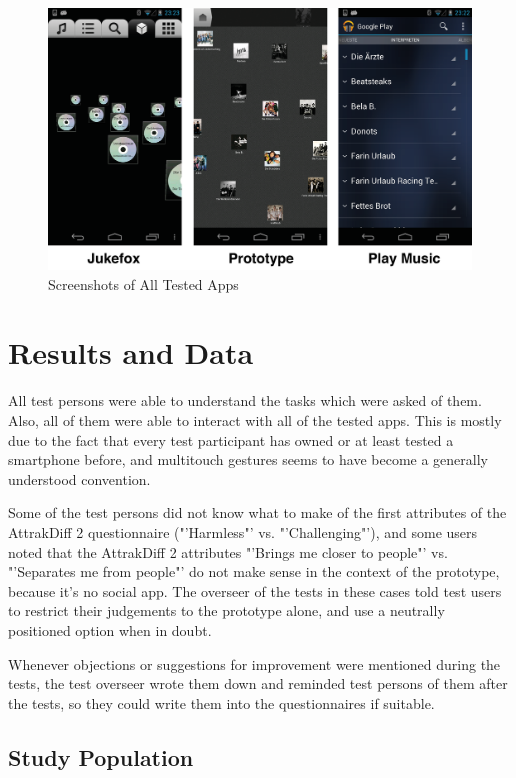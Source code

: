 \begin{figure}[H]
  \centering
    \includegraphics[width=1\textwidth]{figures/apps_screenshots}
  \caption{Screenshots of All Tested Apps}
  \label{fig:apps_screenshots}
\end{figure}

\section{Results and Data}

All test persons were able to understand the tasks which were asked of them. Also, all of them were able to interact with all of the tested apps. This is mostly due to the fact that every test participant has owned or at least tested a smartphone before, and multitouch gestures seems to have become a generally understood convention.

Some of the test persons did not know what to make of the first attributes of the AttrakDiff 2 questionnaire ("'Harmless"' vs. "'Challenging"'), and some users noted that the AttrakDiff 2 attributes "'Brings me closer to people"' vs. "'Separates me from people"' do not make sense in the context of the prototype, because it's no social app. The overseer of the tests in these cases told test users to restrict their judgements to the prototype alone, and use a neutrally positioned option when in doubt.

Whenever objections or suggestions for improvement were mentioned during the tests, the test overseer wrote them down and reminded test persons of them after the tests, so they could write them into the questionnaires if suitable.

\subsection{Study Population}

